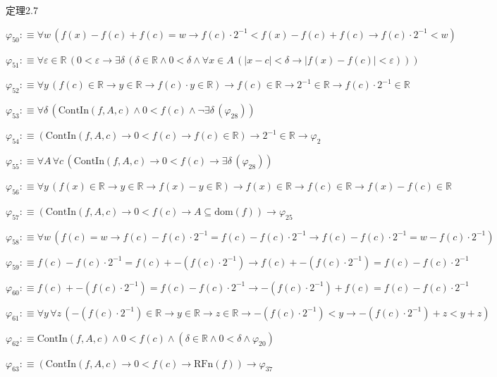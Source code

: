 \begin{fullproof}{定理2.7}
\begin{abbrevlist}
\item $\varphi_{50} :\equiv \forall w\,(f(x) - f(c) + f(c) = w \to f(c) \cdot 2^{-1} < f(x) - f(c) + f(c) \to f(c) \cdot 2^{-1} < w)$
\item $\varphi_{51} :\equiv \forall \varepsilon \in \mathbb{R}\,(0 < \varepsilon \to \exists \delta\,(\delta \in \mathbb{R} \land 0 < \delta \land \forall x \in A\,(\lvert x - c \rvert < \delta \to \lvert f(x) - f(c) \rvert < \varepsilon)))$
\item $\varphi_{52} :\equiv \forall y\,(f(c) \in \mathbb{R} \to y \in \mathbb{R} \to f(c) \cdot y \in \mathbb{R}) \to f(c) \in \mathbb{R} \to 2^{-1} \in \mathbb{R} \to f(c) \cdot 2^{-1} \in \mathbb{R}$
\item $\varphi_{53} :\equiv \forall \delta\,(\mathrm{ContIn}(f,A,c) \land 0 < f(c) \land \neg \exists \delta\,(\varphi_{28}))$
\item $\varphi_{54} :\equiv (\mathrm{ContIn}(f,A,c) \to 0 < f(c) \to f(c) \in \mathbb{R}) \to 2^{-1} \in \mathbb{R} \to \varphi_{2}$
\item $\varphi_{55} :\equiv \forall A\,\forall c\,(\mathrm{ContIn}(f,A,c) \to 0 < f(c) \to \exists \delta\,(\varphi_{28}))$
\item $\varphi_{56} :\equiv \forall y\,(f(x) \in \mathbb{R} \to y \in \mathbb{R} \to f(x) - y \in \mathbb{R}) \to f(x) \in \mathbb{R} \to f(c) \in \mathbb{R} \to f(x) - f(c) \in \mathbb{R}$
\item $\varphi_{57} :\equiv (\mathrm{ContIn}(f,A,c) \to 0 < f(c) \to A \subseteq \mathrm{dom}(f)) \to \varphi_{25}$
\item $\varphi_{58} :\equiv \forall w\,(f(c) = w \to f(c) - f(c) \cdot 2^{-1} = f(c) - f(c) \cdot 2^{-1} \to f(c) - f(c) \cdot 2^{-1} = w - f(c) \cdot 2^{-1})$
\item $\varphi_{59} :\equiv f(c) - f(c) \cdot 2^{-1} = f(c) + -(f(c) \cdot 2^{-1}) \to f(c) + -(f(c) \cdot 2^{-1}) = f(c) - f(c) \cdot 2^{-1}$
\item $\varphi_{60} :\equiv f(c) + -(f(c) \cdot 2^{-1}) = f(c) - f(c) \cdot 2^{-1} \to -(f(c) \cdot 2^{-1}) + f(c) = f(c) - f(c) \cdot 2^{-1}$
\item $\varphi_{61} :\equiv \forall y\,\forall z\,(-(f(c) \cdot 2^{-1}) \in \mathbb{R} \to y \in \mathbb{R} \to z \in \mathbb{R} \to -(f(c) \cdot 2^{-1}) < y \to -(f(c) \cdot 2^{-1}) + z < y + z)$
\item $\varphi_{62} :\equiv \mathrm{ContIn}(f,A,c) \land 0 < f(c) \land (\delta \in \mathbb{R} \land 0 < \delta \land \varphi_{20})$
\item $\varphi_{63} :\equiv (\mathrm{ContIn}(f,A,c) \to 0 < f(c) \to \mathrm{RFn}(f)) \to \varphi_{37}$

\end{abbrevlist}
\end{fullproof}
